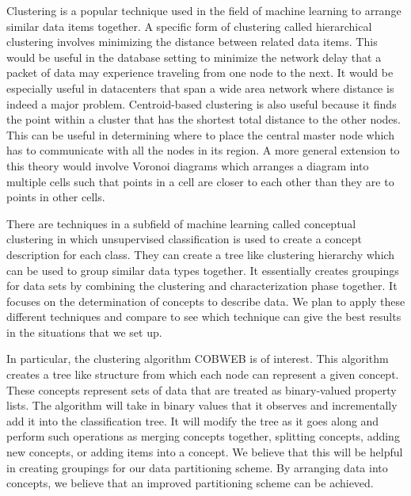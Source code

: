 \documentclass[10pt,final,journal]{IEEEtran}
\begin{document}
Clustering is a popular technique used in the field of machine learning to arrange similar data items together.  A specific form of clustering called hierarchical clustering involves minimizing the distance between related data items.  This would be useful in the database setting to minimize the network delay that a packet of data may experience traveling from one node to the next.  It would be especially useful in datacenters that span a wide area network where distance is indeed a major problem.  Centroid-based clustering is also useful because it finds the point within a cluster that has the shortest total distance to the other nodes.  This can be useful in determining where to place the central master node which has to communicate with all the nodes in its region.  A more general extension to this theory would involve Voronoi diagrams which arranges a diagram into multiple cells such that points in a cell are closer to each other than they are to points in other cells.

There are techniques in a subfield of machine learning called conceptual clustering in which unsupervised classification is used to create a concept description for each class. They can create a tree like clustering hierarchy which can be used to group similar data types together. It essentially creates groupings for data sets by combining the clustering and characterization phase together. It focuses on the determination of concepts to describe data. We plan to apply these different techniques and compare to see which technique can give the best results in the situations that we set up.

In particular, the clustering algorithm COBWEB is of interest. This algorithm creates a tree like structure from which each node can represent a given concept. These concepts represent sets of data that are treated as binary-valued property lists. The algorithm will take in binary values that it observes and incrementally add it into the classification tree. It will modify the tree as it goes along and perform such operations as merging concepts together, splitting concepts, adding new concepts, or adding items into a concept. We believe that this will be helpful in creating groupings for our data partitioning scheme. By arranging data into concepts, we believe that an improved partitioning scheme can be achieved.
\end{document}
